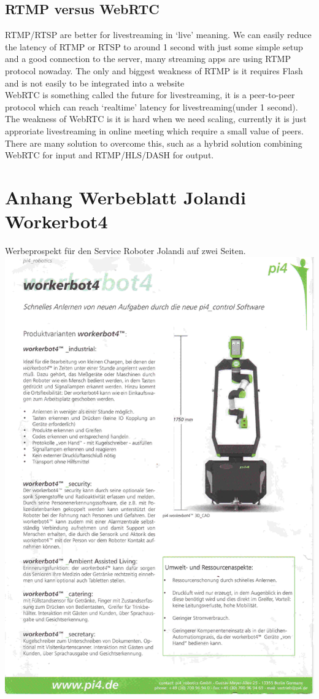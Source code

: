 \subsection{RTMP versus WebRTC}
RTMP/RTSP are better for livestreaming in ‘live’ meaning. We can easily reduce the latency of RTMP or RTSP to around 1 second with just some simple setup and a good connection to the server, many streaming apps are using RTMP protocol nowaday. The only and biggest weakness of RTMP is it requires Flash and is not easily to be integrated into a website\\

WebRTC is something called the future for livestreaming, it is a peer-to-peer protocol which can reach ‘realtime’ latency for livestreaming(under 1 second). The weakness of WebRTC is it is hard when we need scaling, currently it is just approriate livestreaming in online meeting which require a small value of peers. There are many solution to overcome this, such as a hybrid solution combining WebRTC for input and RTMP/HLS/DASH for output.

\newpage
\section{Anhang Werbeblatt Jolandi Workerbot4}
Werbeprospekt für den Service Roboter Jolandi auf zwei Seiten.\\

   \includegraphics[scale=0.75]{img/jolandi1.jpg} 
   
